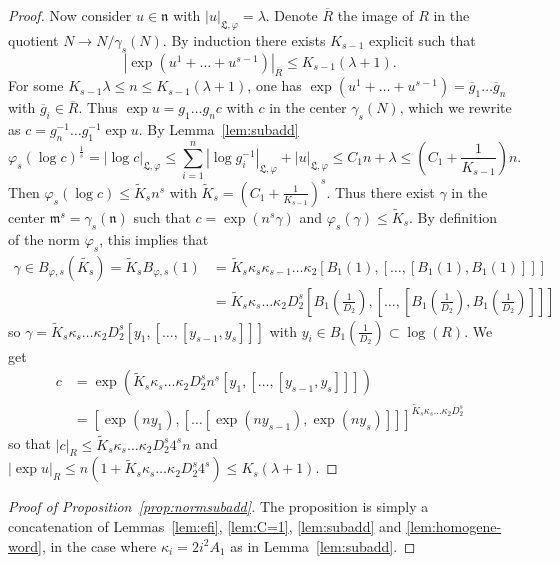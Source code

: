 \documentclass[11pt,leqno]{article}
\theoremstyle{plain}
\theoremstyle{definition}
\theoremstyle{remark}
\numberwithin{equation}{section}
\begin{document}
\begin{proof}
Now consider $u\in \mathfrak{n}$ with $|u|_{\mathfrak{L},\varphi}=\lambda$. Denote $\overline{R}$ the image of $R$ in the quotient $N\to N/\gamma_s(N)$. By induction there exists $K_{s-1}$ explicit such that
\[
|\exp(u^1+\dots+u^{s-1})|_{\overline{R}} \le K_{s-1}(\lambda+1).
\]
For some $K_{s-1}\lambda \le n \le K_{s-1}(\lambda+1)$, one has $\exp(u^1+\dots+u^{s-1})=\overline{g}_1\dots\overline{g}_n$ with $\overline{g}_i \in \overline{R}$. Thus $\exp u=g_1\dots g_nc$ with $c$  in the center $\gamma_s(N)$, which we rewrite as $c=g_n^{-1}\dots g_1^{-1}\exp u$. By Lemma~\ref{lem:subadd}
\[
\varphi_s(\log c)^{\frac{1}{s}}=|\log c|_{\mathfrak{L},\varphi} \le \sum_{i=1}^n |\log g_i^{-1}|_{\mathfrak{L},\varphi}+|u|_{\mathfrak{L},\varphi} \le C_1 n+\lambda \le \left(C_1+\frac{1}{K_{s-1}}\right)n.
\]
Then $\varphi_s(\log c)\le \widetilde{K}_{s}n^s$ with $\widetilde{K}_{s}=\left(C_1+\frac{1}{K_{s-1}}\right)^s$. Thus there exist $\gamma$ in the center $\mathfrak{m}^s=\gamma_s(\mathfrak{n})$ such that $c=\exp(n^s\gamma)$ and $\varphi_s(\gamma) \le \widetilde{K}_{s}$. By definition of the norm $\varphi_s$, this implies that 
\begin{align*}
\gamma \in B_{\varphi,s}(\widetilde{K_s})  =\widetilde{K}_sB_{\varphi,s}(1) & =\widetilde{K}_s\kappa_s\kappa_{s-1}\dots \kappa_2[B_1(1),[\dots,[B_1(1),B_1(1)]]]
\\ 
&=\widetilde{K}_s\kappa_s\dots \kappa_2D_2^s\left[B_1\left(\frac{1}{D_2}\right),\left[\dots,\left[B_1\left(\frac{1}{D_2}\right),B_1\left(\frac{1}{D_2}\right)\right]\right]\right]
\end{align*}
so $\gamma=\widetilde{K}_s\kappa_s\dots \kappa_2D_2^s[y_1,[\dots,[y_{s-1},y_s]]]$ with $y_i \in B_1\left(\frac{1}{D_2}\right)\subset \log(R)$.  We get
\begin{align*}
c&=\exp(\widetilde{K}_s\kappa_s\dots \kappa_2D_2^sn^s[y_1,[\dots,[y_{s-1},y_s]]])\\ &=[\exp(ny_1),[\dots[\exp(ny_{s-1}),\exp(ny_s)]]]^{\widetilde{K}_s\kappa_s\dots \kappa_2D_2^s}
\end{align*}
so that $|c|_R\le \widetilde{K}_s\kappa_s\dots \kappa_2D_2^s4^sn$ and $|\exp u|_R \le n(1+\widetilde{K}_s\kappa_s\dots \kappa_2D_2^s4^s)\le K_s (\lambda+1)$.
\end{proof}

\begin{proof}[Proof of Proposition~\ref{prop:normsubadd}]
The proposition is simply a concatenation of Lemmas~\ref{lem:efi}, \ref{lem:C=1},  \ref{lem:subadd} and \ref{lem:homogene-word}, in the case where $\kappa_i=2i^2A_1$ as in Lemma~\ref{lem:subadd}.
\end{proof}
\end{document}
